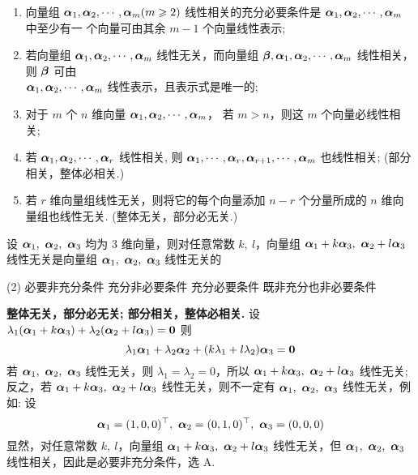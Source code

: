 \begin{theorem}[向量组线性相关的若干结论]
    \begin{enumerate}[label=(\arabic{*})]
        \item 向量组 $ \vb*{\alpha}_{1}, \vb*{\alpha}_{2}, \cdots, \vb*{\alpha}_{m}(m \geqslant 2) $ 线性相关的充分必要条件是 $ \vb*{\alpha}_{1}, \vb*{\alpha}_{2}, \cdots, \vb*{\alpha}_{m} $ 中至少有一 个向量可由其余 $ m-1 $ 个向量线性表示;
        \item 若向量组 $ \vb*{\alpha}_{1}, \vb*{\alpha}_{2}, \cdots, \vb*{\alpha}_{m} $ 线性无关，而向量组 $ \vb*{\beta}, \vb*{\alpha}_{1}, \vb*{\alpha}_{2}, \cdots, \vb*{\alpha}_{m} $ 线性相关，则 $ \vb*{\beta} $ 可由 \\$ \vb*{\alpha}_{1}, \vb*{\alpha}_{2}, \cdots, \vb*{\alpha}_{m} $ 线性表示，且表示式是唯一的;
        \item 对于 $ m $ 个 $ n $ 维向量 $ \vb*{\alpha}_{1}, \vb*{\alpha}_{2}, \cdots, \vb*{\alpha}_{m}$， 若 $ m>n $，则这 $ m $ 个向量必线性相关;
        \item 若 $ \vb*{\alpha}_{1}, \vb*{\alpha}_{2}, \cdots, \vb*{\alpha}_{r} $ 线性相关, 则 $ \vb*{\alpha}_{1}, \cdots, \vb*{\alpha}_{r}, \vb*{\alpha}_{r+1}, \cdots, \vb*{\alpha}_{m} $ 也线性相关; (部分相关，整体必相关.)
        \item 若 $ r $ 维向量组线性无关，则将它的每个向量添加 $ n-r $ 个分量所成的 $ n $ 维向量组也线性无关. (整体无关，部分必无关.)
    \end{enumerate}
\end{theorem}

\begin{example}[2014 数一]
    设 $\vb*{\alpha}_1,~\vb*{\alpha}_2,~\vb*{\alpha}_3$ 均为 3 维向量，则对任意常数 $k,~l$，向量组 $\vb*{\alpha}_1+k\vb*{\alpha}_3,~\vb*{\alpha}_2+l\vb*{\alpha}_3$ 线性无关是向量组 $\vb*{\alpha}_1,~\vb*{\alpha}_2,~\vb*{\alpha}_3$ 线性无关的
    \begin{tasks}(2)
        \task 必要非充分条件
        \task 充分非必要条件
        \task 充分必要条件
        \task 既非充分也非必要条件
    \end{tasks}
\end{example}
\begin{solution}
    \textbf{整体无关，部分必无关; 部分相关，整体必相关. }
    设 $\lambda_1(\vb*{\alpha}_1+k\vb*{\alpha}_3)+\lambda_2(\vb*{\alpha}_2+l\vb*{\alpha}_3)=\vb*{0}$ 则 $$\lambda_1\vb*{\alpha}_1+\lambda_2\vb*{\alpha}_2+(k\lambda_1+l\lambda_2)\vb*{\alpha}_3=\vb*{0}$$
    若 $\vb*{\alpha}_1,~\vb*{\alpha}_2,~\vb*{\alpha}_3$ 线性无关，则 $\lambda_1=\lambda_2=0$，所以 $\vb*{\alpha}_1+k\vb*{\alpha}_3,~\vb*{\alpha}_2+l\vb*{\alpha}_3$ 线性无关;
    反之，若 $\vb*{\alpha}_1+k\vb*{\alpha}_3,~\vb*{\alpha}_2+l\vb*{\alpha}_3$ 线性无关，则不一定有 $\vb*{\alpha}_1,~\vb*{\alpha}_2,~\vb*{\alpha}_3$ 线性无关，例如: 设
    $$\vb*{\alpha}_1=(1,0,0)^\top,~\vb*{\alpha}_2=(0,1,0)^\top,~\vb*{\alpha}_3=(0,0,0)$$
    显然，对任意常数 $k,~l$，向量组 $\vb*{\alpha}_1+k\vb*{\alpha}_3,~\vb*{\alpha}_2+l\vb*{\alpha}_3$ 线性无关，但 $\vb*{\alpha}_1,~\vb*{\alpha}_2,~\vb*{\alpha}_3$ 线性相关，因此是必要非充分条件，选 A.
\end{solution}

